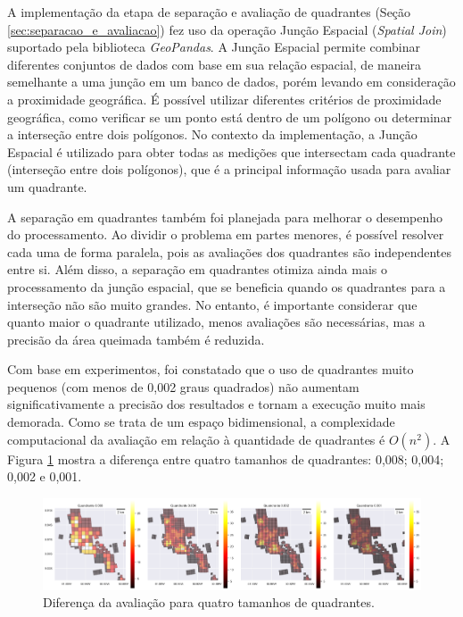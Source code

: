 \documentclass[cic,tc]{iiufrgs}
\begin{document}
A implementação da etapa de separação e avaliação de quadrantes (Seção \ref{sec:separacao_e_avaliacao}) fez uso da operação Junção Espacial (\textit{Spatial Join}) suportado pela biblioteca \textit{GeoPandas}. A Junção Espacial permite combinar diferentes conjuntos de dados com base em sua relação espacial, de maneira semelhante a uma junção em um banco de dados, porém levando em consideração a proximidade geográfica. É possível utilizar diferentes critérios de proximidade geográfica, como verificar se um ponto está dentro de um polígono ou determinar a interseção entre dois polígonos. No contexto da implementação, a Junção Espacial é utilizado para obter todas as medições que intersectam cada quadrante (interseção entre dois polígonos), que é a principal informação usada para avaliar um quadrante.

A separação em quadrantes também foi planejada para melhorar o desempenho do processamento. Ao dividir o problema em partes menores, é possível resolver cada uma de forma paralela, pois as avaliações dos quadrantes são independentes entre si. Além disso, a separação em quadrantes otimiza ainda mais o processamento da junção espacial, que se beneficia quando os quadrantes para a interseção não são muito grandes. No entanto, é importante considerar que quanto maior o quadrante utilizado, menos avaliações são necessárias, mas a precisão da área queimada também é reduzida.

Com base em experimentos, foi constatado que o uso de quadrantes muito pequenos (com menos de 0,002 graus quadrados) não aumentam significativamente a precisão dos resultados e tornam a execução muito mais demorada. Como se trata de um espaço bidimensional, a complexidade computacional da avaliação em relação à quantidade de quadrantes é $O(n^2)$. A Figura \ref{fig:diferenca_entre_quadrantes} mostra a diferença entre quatro tamanhos de quadrantes: 0,008; 0,004; 0,002 e 0,001.

\begin{figure}[H]
    \caption{Diferença da avaliação para quatro tamanhos de quadrantes.}
    \begin{center}
        \includegraphics[width=35em]{diferenca_entre_quadrantes}
    \end{center}
    \label{fig:diferenca_entre_quadrantes}
\end{figure}
\end{document}
